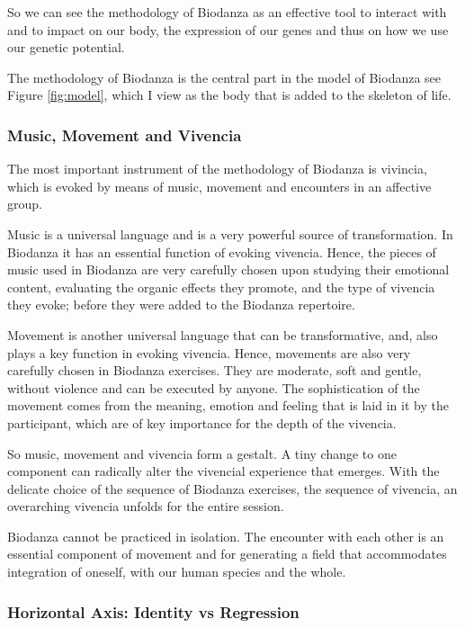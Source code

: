 \documentclass[
  11pt,
]{book}
\begin{document}
So we can see the methodology of Biodanza as an effective tool to interact with and to impact on our body, the expression of our genes and thus on how we use our genetic potential.

The methodology of Biodanza is the central part in the model of Biodanza see Figure \ref{fig:model}, which I view as the body that is added to the skeleton of life.

\hypertarget{music-movement-and-vivencia}{%
\subsubsection{Music, Movement and Vivencia}\label{music-movement-and-vivencia}}

The most important instrument of the methodology of Biodanza is vivincia, which is evoked by means of music, movement and encounters in an affective group.

Music is a universal language and is a very powerful source of transformation. In Biodanza it has an essential function of evoking vivencia. Hence, the pieces of music used in Biodanza are very carefully chosen upon studying their emotional content, evaluating the organic effects they promote, and the type of vivencia they evoke; before they were added to the Biodanza repertoire.

Movement is another universal language that can be transformative, and, also plays a key function in evoking vivencia. Hence, movements are also very carefully chosen in Biodanza exercises. They are moderate, soft and gentle, without violence and can be executed by anyone. The sophistication of the movement comes from the meaning, emotion and feeling that is laid in it by the participant, which are of key importance for the depth of the vivencia.

So music, movement and vivencia form a gestalt. A tiny change to one component can radically alter the vivencial experience that emerges.
With the delicate choice of the sequence of Biodanza exercises, the sequence of vivencia, an overarching vivencia unfolds for the entire session.

Biodanza cannot be practiced in isolation. The encounter with each other is an essential component of movement and for generating a field that accommodates integration of oneself, with our human species and the whole.

\hypertarget{horizontal-axis-identity-vs-regression}{%
\subsubsection{Horizontal Axis: Identity vs Regression}\label{horizontal-axis-identity-vs-regression}}
\end{document}
